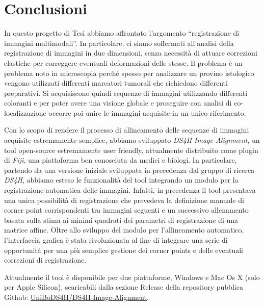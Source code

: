 \chapter{Conclusioni}
\label{chap:conclusion}
\noindent In questo progetto di Tesi abbiamo affrontato l’argomento “registrazione di immagini multimodali”. In particolare, ci siamo soffermati all’analisi della registrazione di immagini in due dimensioni, senza necessità di attuare correzioni elastiche per correggere eventuali deformazioni delle stesse. Il problema è un problema noto in microscopia perché spesso per analizzare un provino istologico vengono utilizzati differenti marcatori tumorali che richiedono differenti preparativi. Si acquisiscono quindi sequenze di immagini utilizzando differenti coloranti e per poter avere una visione globale e proseguire con analisi di co-localizzazione occorre poi unire le immagini acquisite in un unico riferimento.\hfill\break

\noindent Con lo scopo di rendere il processo di allineamento delle sequenze di immagini acquisite estremamente semplice, abbiamo sviluppato \textit{DS4H Image Alignment}, un tool open-source estremamente user friendly, attualmente distribuito come plugin di \textit{Fiji}, una piattaforma ben conosciuta da medici e biologi. In particolare, partendo da una versione iniziale sviluppata in precedenza dal gruppo di ricerca \textit{DS4H}, abbiamo esteso le funzionalità del tool integrando un modulo per la registrazione automatica delle immagini. Infatti, in precedenza il tool presentava una unica possibilità di registrazione che prevedeva la definizione manuale di corner point corrispondenti tra immagini seguenti e un successivo allenamento basata sulla stima ai minimi quadrati dei parametri di registrazione di una matrice affine. Oltre allo sviluppo del modulo per l’allineamento automatico, l’interfaccia grafica è stata rivoluzionata al fine di integrare una serie di opportunità per una più semplice gestione dei corner points e delle eventuali correzioni di registrazione.\hfill\break

\noindent Attualmente il tool è disponibile per due piattaforme, Windows e Mac Os X (solo per Apple Silicon), scaricabili dalla sezione Release della repository pubblica Github: \hyperref[https://github.com/UniBoDS4H/DS4H-Image-Alignment]{UniBoDS4H/DS4H-Image-Alignment}.\hfill\break

